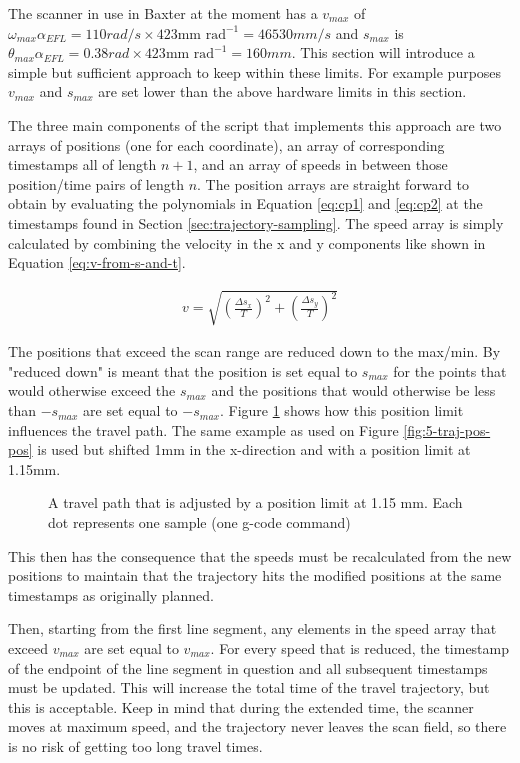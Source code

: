 The scanner in use in Baxter at the moment \cite{scanner-spec} has a $v_{max}$ of $\omega_{max}\alpha_{EFL} = 110 rad/s \times 423 \text{mm rad}^{-1} = 46530 mm/s$ and $s_{max}$ is $\theta_{max}\alpha_{EFL} = 0.38 rad \times 423 \text{mm rad}^{-1} = 160mm$. This section will introduce a simple but sufficient approach to keep within these limits. For example purposes $v_{max}$ and $s_{max}$ are set lower than the above hardware limits in this section.

The three main components of the script that implements this approach are two arrays of positions (one for each coordinate), an array of corresponding timestamps all of length $n+1$, and an array of speeds in between those position/time pairs of length $n$. The position arrays are straight forward to obtain by evaluating the polynomials in Equation \ref{eq:cp1} and \ref{eq:cp2} at the timestamps found in Section \ref{sec:trajectory-sampling}. The speed array is simply calculated by combining the velocity in the x and y components like shown in Equation \ref{eq:v-from-s-and-t}.

\begin{align}
    v = \sqrt{\left(\frac{\Delta s_x}{T}\right)^2 +  \left(\frac{\Delta s_y}{T}\right)^2}
    \label{eq:v-from-s-and-t}
\end{align}

The positions that exceed the scan range are reduced down to the max/min. By "reduced down" is meant that the position is set equal to $s_{max}$ for the points that would otherwise exceed the $s_{max}$ and the positions that would otherwise be less than $-s_{max}$ are set equal to $-s_{max}$. Figure \ref{fig:position-limit} shows how this position limit influences the travel path. The same example as used on Figure \ref{fig:5-traj-pos-pos} is used but shifted 1mm in the x-direction and with a position limit at 1.15mm.

\begin{figure}
    \centering
    
    \caption{A travel path that is adjusted by a position limit at 1.15 mm. Each dot represents one sample (one g-code command)}
    \label{fig:position-limit}
\end{figure}

This then has the consequence that the speeds must be recalculated from the new positions to maintain that the trajectory hits the modified positions at the same timestamps as originally planned.

Then, starting from the first line segment, any elements in the speed array that exceed $v_{max}$ are set equal to $v_{max}$. For every speed that is reduced, the timestamp of the endpoint of the line segment in question and all subsequent timestamps must be updated. This will increase the total time of the travel trajectory, but this is acceptable. Keep in mind that during the extended time, the scanner moves at maximum speed, and the trajectory never leaves the scan field, so there is no risk of getting too long travel times.

